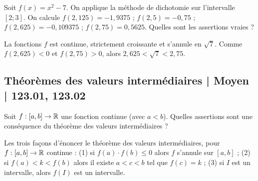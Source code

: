 \begin{question}

Soit $f(x)=x^2-7$. On applique la méthode de dichotomie sur l'intervalle $[2 ; 3]$. 
On calcule $f(2,125)=-1,9375$ ; $f(2,5) = -0,75$ ; $f(2,625) = -0,109375$ ; $f(2,75) = 0,5625$. Quelles sont les assertions vraies ?
\begin{answers}




\end{answers}
\begin{explanations}
La fonctions $f$ est continue, strictement croissante et s'annule en $\sqrt{7}$. 
Comme $f(2,625) < 0$ et $f(2,75) > 0$, alors
$2,625 < \sqrt{7} < 2,75$.
\end{explanations}
\end{question}




\subsection{Théorèmes des valeurs intermédiaires | Moyen | 123.01, 123.02}

\begin{question}

Soit $f : [a,b] \to \mathbb{R}$ une fonction continue (avec $a < b$). Quelles assertions sont une conséquence du théorème des valeurs intermédiaires ?
\begin{answers}



    \bad{Si $c \in ]a,b[$ alors $f(c) \in ]f(a),f(b)[$.}
\end{answers}
\begin{explanations}
Les trois façons d'énoncer le théorème des valeurs intermédiaires, pour $f : [a,b] \to \mathbb{R}$ continue :
(1) si $f(a) \cdot f(b) \le 0$ alors $f$ s'annule sur $[a,b]$ ;
(2) si $f(a) < k < f(b)$ alors il existe $a < c < b$ tel que $f(c)=k$ ;
(3) si $I$ est un intervalle, alors $f(I)$ est un intervalle.
\end{explanations}
\end{question}


